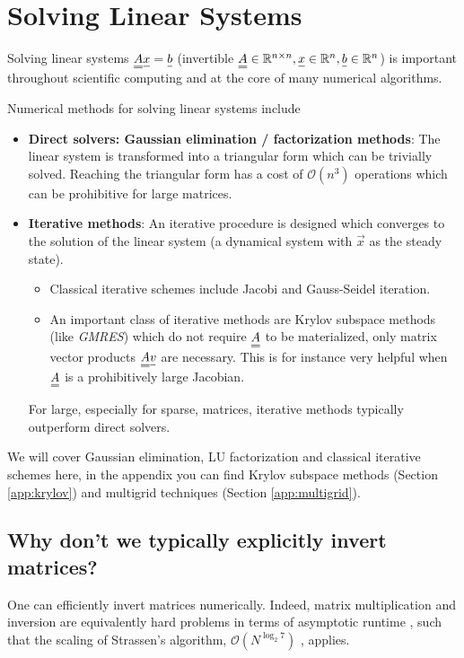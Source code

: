 \section{Solving Linear Systems}
\label{sec:linear}
\thispagestyle{plain}

Solving linear systems $\mat{A}\vec{x} = \vec{b}$ (invertible $\mat{A} \in \mathbb{R}^{n \times n}, \vec{x} \in \mathbb{R}^{n}, \vec{b} \in \mathbb{R}^{n}$) 
is important throughout scientific computing and at the core of many numerical algorithms.

Numerical methods for solving linear systems include

\begin{itemize}
    \item \textbf{Direct solvers: Gaussian elimination / factorization methods}: The linear system is transformed into a 
    triangular form which can be trivially solved. Reaching the triangular form has a cost of $\mathcal{O}(n^3)$
    operations which can be prohibitive for large matrices.
    \item \textbf{Iterative methods}: An iterative procedure is designed which converges to the solution
    of the linear system (a dynamical system with $\vec{x}$ as the steady state).
    \begin{itemize}
        \item Classical iterative schemes include Jacobi and Gauss-Seidel iteration. 
        \item An important class of iterative methods are Krylov subspace methods (like \textit{GMRES}) which do not require $\mat{A}$ to be 
        materialized, only matrix vector products $\mat{A}\vec{v}$ are necessary. This is for instance very helpful 
        when $\mat{A}$ is a prohibitively large Jacobian.
    \end{itemize}
    For large, especially for sparse, matrices, iterative methods typically outperform direct solvers.
\end{itemize}

We will cover Gaussian elimination, LU factorization and classical iterative schemes here, in the appendix
you can find Krylov subspace methods (Section \ref{app:krylov}) and 
multigrid techniques (Section \ref{app:multigrid}).

\subsection{Why don't we typically explicitly invert matrices?}
One can efficiently invert matrices numerically. Indeed, matrix multiplication and 
inversion are equivalently hard problems in terms of asymptotic runtime \citep[Sec. 28.2]{cormen}, 
such that the scaling of Strassen's algorithm, $\mathcal{O}(N^{\log_2 7})$ \citep[Sec. 4.2]{cormen}, applies.

